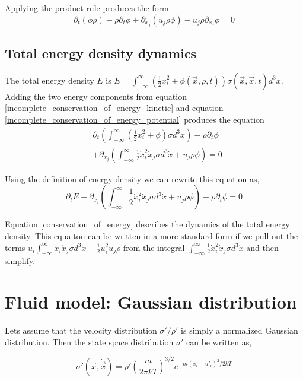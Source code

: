 \documentclass[%
 twocolumn,
 amsmath,amssymb,
 aps,
]{revtex4-1}
\newcommand{\dvec}[1]{\dot{\vec{#1}}}
\newcommand{\intVdot}[1]{\int_{-\infty}^{\infty} #1 d^3\dot{x}}
\begin{document}
Applying the product rule produces the form
\begin{equation}
\partial_t\left(\phi\rho\right) - \rho\partial_t\phi + \partial_{x_j}\left(u_j\rho\phi\right) - u_j\rho\partial_{x_j}\phi=0
\label{incomplete_conservation_of_energy_potential}
\end{equation}


\subsection{Total energy density dynamics}
The total energy density $E$ is $E=\intVdot{\left(\frac{1}{2}\dot{x}_i^2 + \phi(\vec{x}, \rho, t)\right)\sigma(\vec{x}, \dvec{x}, t)}$. Adding the two energy components from equation \eqref{incomplete_conservation_of_energy_kinetic} and equation \eqref{incomplete_conservation_of_energy_potential} produces the equation
\[
\begin{split}
& \partial_t\left(\intVdot{\left(\frac{1}{2}\dot{x}_i^2 + \phi\right)\sigma}\right) - \rho\partial_t\phi \\& + \partial_{x_j}\left(\intVdot{\frac{1}{2}\dot{x}_i^2\dot{x}_j\sigma} + u_j\rho\phi\right)=0
\end{split}
\]

Using the definition of energy density we can rewrite this equation as, 
\begin{equation}
\partial_t E + \partial_{x_j}\left(\intVdot{\frac{1}{2}\dot{x}_i^2\dot{x}_j\sigma} + u_j\rho\phi\right) - \rho\partial_t\phi=0
\label{conservation_of_energy}
\end{equation}

Equation \eqref{conservation_of_energy} describes the dynamics of the total energy density. This equaiton can be written in a more standard form if we pull out the terms $u_i\intVdot{\dot{x}_i\dot{x}_j\sigma} - \frac{1}{2}u_i^2u_j\rho$ from the integral $\intVdot{\frac{1}{2}\dot{x}_i^2\dot{x}_j\sigma}$ and then simplify.

\section{Fluid model: Gaussian distribution}
Lets assume that the velocity distribution $\sigma'/\rho'$ is simply a normalized Gaussian distribution. Then the state space distribution $\sigma'$ can be written as,

\begin{equation}
\sigma'(\vec{x}, \dvec{x}) = \rho'\left(\frac{m}{2\pi kT}\right)^{3/2}e^{-m\left(x_i - u'_i\right)^2/2kT}
\label{gaussian_state_space}
\end{equation}
\end{document}
